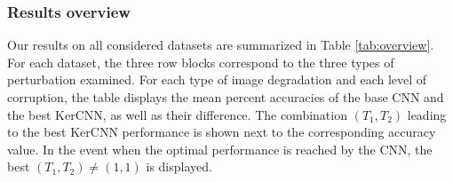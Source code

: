 \documentclass[11pt,oneside,reqno]{amsart}
\begin{document}
 
 
 \subsubsection{Results overview}\label{resoverview}
 
 Our results on all considered datasets are summarized in Table \ref{tab:overview}. For each dataset, the three row blocks correspond to the three types of perturbation examined. For each type of image degradation and each level of corruption, the table displays the mean percent accuracies of the base CNN and the best KerCNN, as well as their difference. The combination $(T_1,T_2)$ leading to the best KerCNN performance is shown next to the corresponding accuracy value. In the event when the optimal performance is reached by the CNN, the best $(T_1,T_2)\neq(1,1)$ is displayed.
\end{document}
